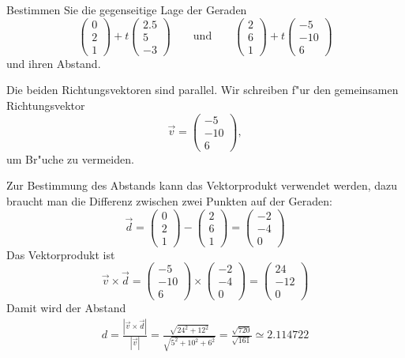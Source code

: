 Bestimmen Sie die gegenseitige Lage der Geraden
\[
\begin{pmatrix}0\\2\\1\end{pmatrix}
+t
\begin{pmatrix}2.5\\5\\-3\end{pmatrix}
\qquad
\text{und}
\qquad
\begin{pmatrix}2\\6\\1\end{pmatrix}
+t
\begin{pmatrix}-5\\-10\\6\end{pmatrix}
\]
und ihren Abstand.

\begin{loesung}
Die beiden Richtungsvektoren sind parallel.
Wir schreiben f"ur den gemeinsamen Richtungsvektor
\[
\vec v=
\begin{pmatrix}-5\\-10\\6\end{pmatrix},
\]
um Br"uche zu vermeiden.

Zur Bestimmung des
Abstands kann das Vektorprodukt verwendet werden, dazu braucht man
die Differenz zwischen zwei Punkten auf der Geraden:
\[
\vec d=
\begin{pmatrix}0\\2\\1\end{pmatrix}
-\begin{pmatrix}2\\6\\1\end{pmatrix}
=
\begin{pmatrix}-2\\-4\\0\end{pmatrix}
\]
Das Vektorprodukt ist
\[
\vec v\times \vec d
=
\begin{pmatrix}-5\\-10\\6\end{pmatrix}
\times
\begin{pmatrix}-2\\-4\\0\end{pmatrix}
=
\begin{pmatrix}24\\-12\\0\end{pmatrix}
\]
Damit wird der Abstand
\begin{align*}
d
=
\frac{|\vec v\times \vec d|}{|\vec v|}
=\frac{\sqrt{24^2+12^2}}{\sqrt{5^2+10^2+6^2}}
=\frac{\sqrt{720}}{\sqrt{161}}
\simeq 2.114722
\end{align*}
\end{loesung}

